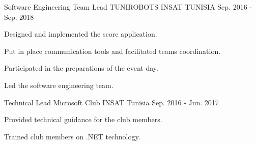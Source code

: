 

\begin{cventries}

  \cventry
    {Software Engineering Team Lead} %
    {TUNIROBOTS INSAT} %
    {TUNISIA} %
    {Sep. 2016 - Sep. 2018} %
    {
      \begin{cvitems} %
        \item {Designed and implemented the score application.}
        \item {Put in place communication tools and facilitated teams coordination.}
        \item {Participated in the preparations of the event day.}
        \item {Led the software engineering team.}
      \end{cvitems}
    }

  \cventry
    {Technical Lead} %
    {Microsoft Club INSAT} %
    {Tunisia} %
    {Sep. 2016 - Jun. 2017} %
    {
      \begin{cvitems} %
        \item {Provided technical guidance for the club members.}
        \item {Trained club members on .NET technology.}
      \end{cvitems}
    }

\end{cventries}
